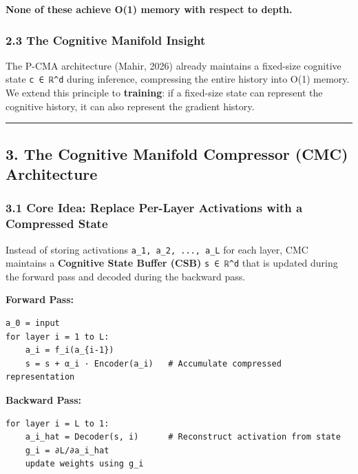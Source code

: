 \documentclass[
  11pt,
  a4paper,
]{article}
\begin{document}
\textbf{None of these achieve O(1) memory with respect to depth.}

\subsubsection{2.3 The Cognitive Manifold
Insight}\label{the-cognitive-manifold-insight}

The P-CMA architecture (Mahir, 2026) already maintains a fixed-size
cognitive state \texttt{c\ ∈\ ℝ\^{}d} during inference, compressing the
entire history into O(1) memory. We extend this principle to
\textbf{training}: if a fixed-size state can represent the cognitive
history, it can also represent the gradient history.

\begin{center}\rule{0.5\linewidth}{0.5pt}\end{center}

\subsection{3. The Cognitive Manifold Compressor (CMC)
Architecture}\label{the-cognitive-manifold-compressor-cmc-architecture}

\subsubsection{3.1 Core Idea: Replace Per-Layer Activations with a
Compressed
State}\label{core-idea-replace-per-layer-activations-with-a-compressed-state}

Instead of storing activations \texttt{a\_1,\ a\_2,\ ...,\ a\_L} for
each layer, CMC maintains a \textbf{Cognitive State Buffer (CSB)}
\texttt{s\ ∈\ ℝ\^{}d} that is updated during the forward pass and
decoded during the backward pass.

\textbf{Forward Pass:}

\begin{verbatim}
a_0 = input
for layer i = 1 to L:
    a_i = f_i(a_{i-1})
    s = s + α_i · Encoder(a_i)   # Accumulate compressed representation
\end{verbatim}

\textbf{Backward Pass:}

\begin{verbatim}
for layer i = L to 1:
    a_i_hat = Decoder(s, i)      # Reconstruct activation from state
    g_i = ∂L/∂a_i_hat
    update weights using g_i
\end{verbatim}
\end{document}
